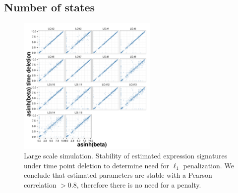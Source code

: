 \subsection{Number of states}
\label{sec:number-states-res}

\begin{figure}
  \centering
  \includegraphics[width=0.6\textwidth]{pics/no-pen-sim.pdf}
  \caption{Large scale simulation. Stability of estimated expression signatures under time point deletion to determine need for $\ell_1$ penalization. We conclude that estimated parameters are stable with a Pearson correlation $>0.8$, therefore there is no need for a penalty.}
  \label{fig:lrg-sim-stab-l1}
\end{figure}

